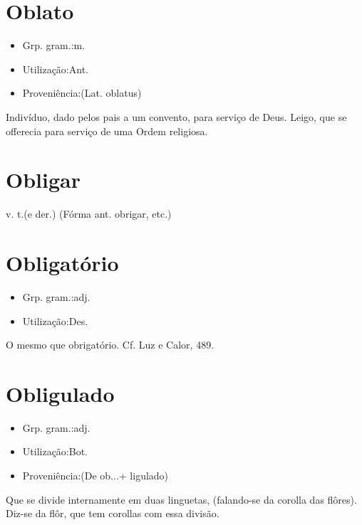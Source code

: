 \section{Oblato}
\begin{itemize}
\item {Grp. gram.:m.}
\end{itemize}
\begin{itemize}
\item {Utilização:Ant.}
\end{itemize}
\begin{itemize}
\item {Proveniência:(Lat. \textunderscore oblatus\textunderscore )}
\end{itemize}
Indivíduo, dado pelos pais a um convento, para serviço de Deus.
Leigo, que se offerecia para serviço de uma Ordem religiosa.
\section{Obligar}
\textunderscore v. t.\textunderscore  (e der.)
(Fórma ant. \textunderscore obrigar\textunderscore , etc.)
\section{Obligatório}
\begin{itemize}
\item {Grp. gram.:adj.}
\end{itemize}
\begin{itemize}
\item {Utilização:Des.}
\end{itemize}
O mesmo que \textunderscore obrigatório\textunderscore . Cf. \textunderscore Luz e Calor\textunderscore , 489.
\section{Obligulado}
\begin{itemize}
\item {Grp. gram.:adj.}
\end{itemize}
\begin{itemize}
\item {Utilização:Bot.}
\end{itemize}
\begin{itemize}
\item {Proveniência:(De \textunderscore ob...\textunderscore  + \textunderscore ligulado\textunderscore )}
\end{itemize}
Que se divide internamente em duas linguetas, (falando-se da corolla das flôres).
Diz-se da flôr, que tem corollas com essa divisão.
